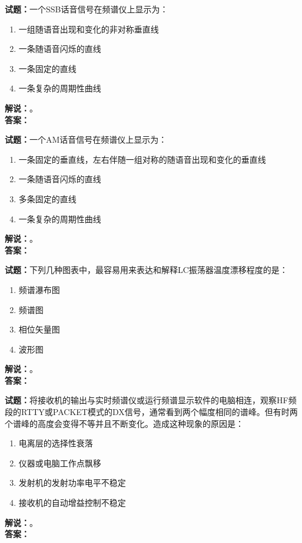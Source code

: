 \documentclass{ctexbook}
\begin{document}
\vspace{\baselineskip}

\noindent\textbf{试题：}一个SSB话音信号在频谱仪上显示为：
\begin{enumerate}[leftmargin=3em]
  \item 一组随语音出现和变化的非对称垂直线
  \item 一条随语音闪烁的直线
  \item 一条固定的直线
  \item 一条复杂的周期性曲线
\end{enumerate}
\noindent\textbf{解说：}\textbf{}。\\\noindent\textbf{答案：}

\vspace{\baselineskip}

\noindent\textbf{试题：}一个AM话音信号在频谱仪上显示为：
\begin{enumerate}[leftmargin=3em]
  \item 一条固定的垂直线，左右伴随一组对称的随语音出现和变化的垂直线
  \item 一条随语音闪烁的直线
  \item 多条固定的直线
  \item 一条复杂的周期性曲线
\end{enumerate}
\noindent\textbf{解说：}\textbf{}。\\\noindent\textbf{答案：}

\vspace{\baselineskip}

\noindent\textbf{试题：}下列几种图表中，最容易用来表达和解释LC振荡器温度漂移程度的是：
\begin{enumerate}[leftmargin=3em]
  \item 频谱瀑布图
  \item 频谱图
  \item 相位矢量图
  \item 波形图
\end{enumerate}
\noindent\textbf{解说：}\textbf{}。\\\noindent\textbf{答案：}

\vspace{\baselineskip}

\noindent\textbf{试题：}将接收机的输出与实时频谱仪或运行频谱显示软件的电脑相连，观察HF频段的RTTY或PACKET模式的DX信号，通常看到两个幅度相同的谱峰。但有时两个谱峰的高度会变得不等并且不断变化。造成这种现象的原因是：
\begin{enumerate}[leftmargin=3em]
  \item 电离层的选择性衰落
  \item 仪器或电脑工作点飘移
  \item 发射机的发射功率电平不稳定
  \item 接收机的自动增益控制不稳定
\end{enumerate}
\noindent\textbf{解说：}\textbf{}。\\\noindent\textbf{答案：}
\end{document}
